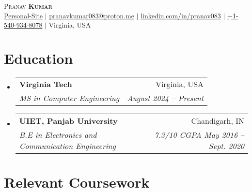 \documentclass[letterpaper,11pt]{article}
\makeatletter
\newcommand{\resumeSubheading}[4]{
  \vspace{-2pt}\item
    \begin{tabular*}{0.97\textwidth}[t]{l@{\extracolsep{\fill}}r}
      \textbf{#1} & #2 \\
      \textit{\small#3} & \textit{\small #4} \\
    \end{tabular*}\vspace{-7pt}
}
\newcommand{\resumeSubHeadingListStart}{\begin{itemize}[leftmargin=0.15in, label={}]}
\newcommand{\resumeSubHeadingListEnd}{\end{itemize}}
\makeatother
\begin{document}

\begin{center}
    {\Huge \scshape Pranav \textbf{Kumar}} \\ \vspace{1pt}
    \href{https://pranav083.github.io/}{\underline{Personal-Site}} $|$
    \href{mailto:pranavkumar083@proton.me}{\underline{pranavkumar083@proton.me}} $|$
    \href{https://linkedin.com/in/pranav083}{\underline{linkedin.com/in/pranav083}} $|$
    \small{\underline{+1-540-934-8078}} $|$
    \small{ Virginia, USA}   
\end{center}

\section{Education}
  \resumeSubHeadingListStart
    \resumeSubheading
      {Virginia Tech}{Virginia, USA}
      {MS in Computer Engineering }{ August 2024 -- Present}

    \resumeSubheading
      {UIET, Panjab University}{Chandigarh, IN}
      {B.E in Electronics and Communication Engineering }{7.3/10 CGPA May 2016 -- Sept. 2020}

  \resumeSubHeadingListEnd

\section{Relevant Coursework}

\begin{itemize}[leftmargin=0.15in, label={}]
  \small{\item \hspace{0pt}{
   \hspace{-4pt}{Basic Electronic Devices and Circuits, Operating Systems, Computer Architecture, 
   Data Structure and Algorithm, Microprocessors and Microcontrollers,  Digital Electronics, Verilog, Linear Integrated Circuits
   and its Applications (IC),  Switching Theory and Logical Design,
   Digital Signal, Computer Network, Processing (DSP),Digital Control Systems} \\
  }}
\end{itemize}
\end{document}
